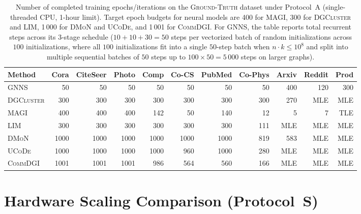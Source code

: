 \documentclass[11pt,a4paper]{article}
\begin{document}
\begin{table}[H]
    \centering
    \caption{Number of completed training epochs/iterations on the \textsc{Ground-Truth} dataset under Protocol~A (single-threaded CPU, 1-hour limit). Target epoch budgets for neural models are 400 for \textsc{MAGI}, 300 for \textsc{DGCluster} and \textsc{LIM}, 1\,000 for \textsc{DMoN} and \textsc{UCoDe}, and 1\,001 for \textsc{CommDGI}. For \textsc{GNNS}, the table reports total recurrent steps across its 3-stage schedule ($10+10+30 = 50$ steps per vectorized batch of random initializations across $100$ initializations, where all $100$ initializations fit into a single $50$-step batch when $n \cdot k \le 10^8$ and split into multiple sequential batches of $50$ steps up to $100 \times 50 = 5\,000$ steps on larger graphs).}
    \label{tab:iterations}
    \vspace{0.5em}
    \small
    \setlength{\tabcolsep}{3.5pt}
    \begin{tabular*}{\textwidth}{@{\extracolsep{\fill}}l rrrrrrrrrr@{}}
        \toprule
        Method             & Cora & CiteSeer & Photo & Comp & Co-CS & PubMed & Co-Phys & Arxiv & Reddit & Prod \\
        \midrule
        \textsc{GNNS}      & 50   & 50       & 50    & 50   & 50    & 50     & 50      & 400   & 120    & 300 \\
        \textsc{DGCluster} & 300  & 300      & 300   & 300  & 300   & 300    & 300     & 270   & MLE    & MLE \\
        \textsc{MAGI}      & 400  & 400      & 400   & 142  & 50    & 140    & 12      & 5     & 7      & TLE \\
        \textsc{LIM}       & 300  & 300      & 300   & 300  & 300   & 300    & 111     & MLE   & MLE    & MLE \\
        \textsc{DMoN}      & 1000 & 1000     & 1000  & 1000 & 1000  & 1000   & 819     & 583   & MLE    & MLE \\
        \textsc{UCoDe}     & 1000 & 1000     & 1000  & 1000 & 960   & 1000   & 280     & MLE   & MLE    & MLE \\
        \textsc{CommDGI}   & 1001 & 1001     & 1001  & 986  & 564   & 560    & 166     & MLE   & MLE    & MLE \\
        \bottomrule
    \end{tabular*}
\end{table}

\section*{Hardware Scaling Comparison (Protocol~S)}
\label{sec:par-seq}
\end{document}

